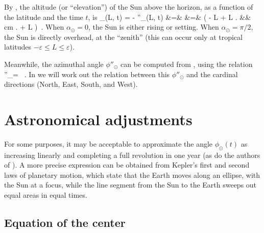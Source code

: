 By , the altitude (or ``elevation'') of the Sun above the horizon, as a function of the latitude and the time $t$, is
\bea
\alpha_\odot (L, t) =  - \theta''_\odot (L, t) &=& \arcsin [z''_\odot (L, t)] \nn
&=& \arcsin \left( - \cos L \cdot {} \cdot \sin {}
+ \cos L \cdot \cos \varepsilon \cdot {} \cdot \cos {} \right. \nn
&&   cm \left. +  \sin L \cdot \sin \varepsilon \cdot {} \right)~.
\eea
When $\alpha_\odot = 0$, the Sun is either rising or setting.  When $\alpha_\odot = \pi / 2$, the Sun is directly overhead, at the ``zenith'' (this can occur only at tropical latitudes $-\varepsilon \leq L \leq \varepsilon$).  

Meanwhile, the azimuthal angle $\phi''_\odot$ can be computed from , using the relation
\be
\tan \phi''_\odot = ~.
\ee
In  we will work out the relation between this $\phi''_\odot$ and the cardinal directions (North, East, South, and West).

\section{Astronomical adjustments}

For some purposes, it may be acceptable to approximate the angle $\phi_\odot (t)$ as increasing linearly and completing a full revolution in one year (as do the authors of \cite{Khavrus}). A more precise expression can be obtained from Kepler's first and second laws of planetary motion, which state that the Earth moves along an ellipse, with the Sun at a focus, while the line segment from the Sun to the Earth sweeps out equal areas in equal times.

\subsection{Equation of the center}

